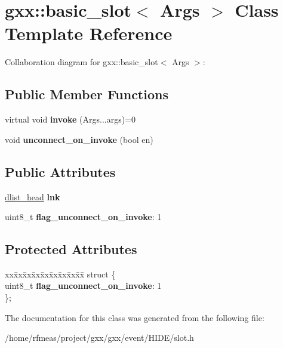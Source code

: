 \hypertarget{classgxx_1_1basic__slot}{}\section{gxx\+:\+:basic\+\_\+slot$<$ Args $>$ Class Template Reference}
\label{classgxx_1_1basic__slot}


Collaboration diagram for gxx\+:\+:basic\+\_\+slot$<$ Args $>$\+:
\subsection*{Public Member Functions}
\begin{DoxyCompactItemize}
\item 
virtual void {\bfseries invoke} (Args...\+args)=0\hypertarget{classgxx_1_1basic__slot_acd9dd2218eceeede793b07f6f5a104a7}{}\label{classgxx_1_1basic__slot_acd9dd2218eceeede793b07f6f5a104a7}

\item 
void {\bfseries unconnect\+\_\+on\+\_\+invoke} (bool en)\hypertarget{classgxx_1_1basic__slot_ae6b3166a79c01e9b818b84e2cd99a823}{}\label{classgxx_1_1basic__slot_ae6b3166a79c01e9b818b84e2cd99a823}

\end{DoxyCompactItemize}
\subsection*{Public Attributes}
\begin{DoxyCompactItemize}
\item 
\hyperlink{structdlist__head}{dlist\+\_\+head} {\bfseries lnk}\hypertarget{classgxx_1_1basic__slot_ac6efa5e7b653f960e7c9a492a819d277}{}\label{classgxx_1_1basic__slot_ac6efa5e7b653f960e7c9a492a819d277}

\item 
uint8\+\_\+t {\bfseries flag\+\_\+unconnect\+\_\+on\+\_\+invoke}\+: 1\hypertarget{classgxx_1_1basic__slot_a535fb110c1ba08716c49a84909008f5e}{}\label{classgxx_1_1basic__slot_a535fb110c1ba08716c49a84909008f5e}

\end{DoxyCompactItemize}
\subsection*{Protected Attributes}
\begin{DoxyCompactItemize}
\item 
\begin{tabbing}
xx\=xx\=xx\=xx\=xx\=xx\=xx\=xx\=xx\=\kill
struct \{\\
\>uint8\_t {\bfseries flag\_unconnect\_on\_invoke}: 1\\
\}; \hypertarget{classgxx_1_1basic__slot_a9e4d31168626180fea20e5e1fffb4ecc}{}\label{classgxx_1_1basic__slot_a9e4d31168626180fea20e5e1fffb4ecc}
\\

\end{tabbing}\end{DoxyCompactItemize}


The documentation for this class was generated from the following file\+:\begin{DoxyCompactItemize}
\item 
/home/rfmeas/project/gxx/gxx/event/\+H\+I\+D\+E/slot.\+h\end{DoxyCompactItemize}
